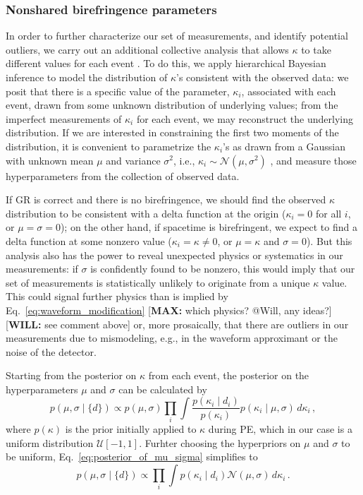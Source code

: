 \documentclass[aps,prd,twocolumn,superscriptaddress,preprintnumbers,floatfix,nofootinbib]{revtex4-2}
\newcommand*{\mi}[1]{\textsf{\color{magenta} [\textbf{MAX:} #1]}}
\newcommand*{\wf}[1]{\textsf{\color{cyan} [\textbf{WILL:} #1]}}
\begin{document}
\subsubsection{Nonshared birefringence parameters}
\label{sec:method:hier}

In order to further characterize our set of measurements, and identify potential outliers, we carry out an additional collective analysis that allows $\kappa$ to take different values for each event \cite{Zimmerman:2019wzo,Isi:2022cii}.
To do this, we apply hierarchical Bayesian inference \cite{Loredo:2004nn} to model the distribution of $\kappa$'s consistent with the observed data:
we posit that there is a specific value of the parameter, $\kappa_i$, associated with each event, drawn from some unknown distribution of underlying values; from the imperfect measurements of $\kappa_i$ for each event, we may reconstruct the underlying distribution.
If we are interested in constraining the first two moments of the distribution, it is convenient to parametrize the $\kappa_i$'s as drawn from a Gaussian with unknown mean $\mu$ and variance $\sigma^2$, i.e., $\kappa_i \sim \mathcal{N}(\mu, \sigma^2)$ \cite{Isi:2019asy}, and measure those hyperparameters from the collection of observed data.

If \ac{GR} is correct and there is no birefringence, we should find the observed $\kappa$ distribution to be consistent with a delta function at the origin ($\kappa_i = 0$ for all $i$, or $\mu=\sigma=0$); on the other hand, if spacetime is birefringent, we expect to find a delta function at some nonzero value ($\kappa_i = \kappa \neq 0$, or $\mu = \kappa$ and $\sigma=0$).
But this analysis also has the power to reveal unexpected physics or systematics in our measurements: if $\sigma$ is confidently found to be nonzero, this would imply that our set of measurements is statistically unlikely to originate from a unique $\kappa$ value.
This could signal further physics than is implied by Eq.~\eqref{eq:waveform_modification} \mi{which physics? @Will, any ideas?} \wf{see comment above} or, more prosaically, that there are outliers in our measurements due to mismodeling, e.g., in the waveform approximant or the noise of the detector.

Starting from the posterior on $\kappa$ from each event, the posterior on the hyperparameters $\mu$ and $\sigma$ can be calculated by
\begin{equation}
    p(\mu,\sigma \mid \{d\})\propto p(\mu,\sigma)\prod_{i}\int\frac{p(\kappa_i\mid d_i)}{p(\kappa_i)}p(\kappa_i\mid\mu,\sigma)\,d\kappa_i\,,
    \label{eq:posterior_of_mu_sigma}
\end{equation}
where $p(\kappa)$ is the prior initially applied to $\kappa$ during \ac{PE}, which in our case is a uniform distribution $\mathcal{U}[-1,1]$.
Furhter choosing the hyperpriors on $\mu$ and $\sigma$ to be uniform, Eq.~\eqref{eq:posterior_of_mu_sigma} simplifies to
\begin{equation}
    p(\mu,\sigma\mid\{d\})\propto\prod_{i}\int p(\kappa_i\mid d_i)\mathcal{N}(\mu,\sigma)\,d\kappa_i\,.
\end{equation}
\end{document}
